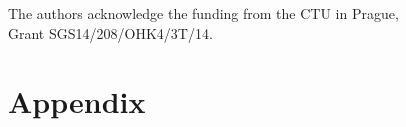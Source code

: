 \documentclass[smallextended]{svjour3}
\begin{document}






\begin{acknowledgements}
The authors acknowledge the funding from the CTU in Prague, \\ Grant SGS14/208/OHK4/3T/14.
\end{acknowledgements}



\section {Appendix}




%
\end{document}
